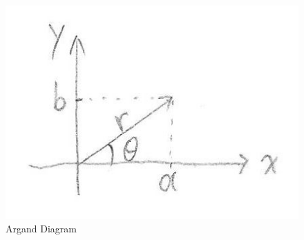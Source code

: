 \documentclass[12pt]{article}
\begin{document}
\begin{flushleft}
	\begin{figure}[H]
	\centering
	\includegraphics[scale=2]{argandDiagram}
	\caption{Argand Diagram}
	\label{fig:argandDiagram}
	\end{figure}	
	

\end{flushleft}
\end{document}
